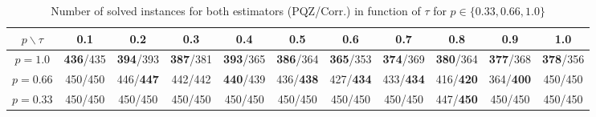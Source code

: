 \begin{table}[H]
\centering
\scriptsize
\renewcommand{\arraystretch}{1.5}
\begin{tabular}{|c|c|c|c|c|c|c|c|c|c|c|}
\hline
$p \backslash \tau$ & 0.1 & 0.2 & 0.3 & 0.4 & 0.5 & 0.6 & 0.7 & 0.8 & 0.9 & 1.0 \\
\hline
$p=1.0$ & \textbf{436}/435 & \textbf{394}/393 & \textbf{387}/381 & \textbf{393}/365 & \textbf{386}/364 & \textbf{365}/353 & \textbf{374}/369 & \textbf{380}/364 & \textbf{377}/368 & \textbf{378}/356 \\
\hline
$p=0.66$ & 450/450 & 446/\textbf{447} & 442/442 & \textbf{440}/439 & 436/\textbf{438} & 427/\textbf{434} & 433/\textbf{434} & 416/\textbf{420} & 364/\textbf{400} & 450/450 \\
\hline
$p=0.33$ & 450/450 & 450/450 & 450/450 & 450/450 & 450/450 & 450/450 & 450/450 & 447/\textbf{450} & 450/450 & 450/450 \\
\hline
\end{tabular}
\caption{Number of solved instances for both estimators (PQZ/Corr.) in function of $\tau$ for $p \in \lbrace 0.33, 0.66, 1.0 \rbrace$}
    \label{nbSolvedTau}
    \normalsize
\end{table}